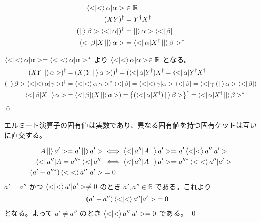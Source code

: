 \documentclass[uplatex,dvipdfmx,a4paper,11pt]{jlreq}
\makeatletter
\newcommand{\RR}{\mathbb{R}}
\numberwithin{equation}{section}
\theoremstyle{definition}
\renewenvironment{proof}[1][\proofname]{\par
  \normalfont
  \topsep6\p@\@plus6\p@ \trivlist
  \item[\hskip\labelsep{\bfseries #1}\@addpunct{\bfseries}]\ignorespaces\quad\par
}{%
  \qed\endtrivlist\@endpefalse
}
\renewcommand\proofname{証明}
\makeatother
\begin{document}
\begin{proposition}
  \begin{align}
    \braket<\alpha|\alpha>            & \in\RR                               \\
    (XY)^\dagger                      & = Y^\dagger X^\dagger                \\
    (\ket|\beta>\bra<\alpha|)^\dagger & = \ket|\alpha>\bra<\beta|            \\
    \bra<\beta|X\ket|\alpha>          & = \bra<\alpha|X^\dagger\ket|\beta>^*
  \end{align}
\end{proposition}
\begin{proof}
  $\braket<\alpha|\alpha> = \braket<\alpha|\alpha>^*$ より $\braket<\alpha|\alpha>\in\RR$ となる。
  \begin{align}
    (XY\ket|\alpha>)^\dagger                    & = (X(Y\ket|\alpha>))^\dagger = (\bra<\alpha|Y^\dagger)X^\dagger = \bra<\alpha|Y^\dagger X^\dagger                 \\
    (\ket|\beta>\braket<\alpha|\gamma>)^\dagger & = \braket<\alpha|\gamma>^*\bra<\beta| = \braket<\gamma|\alpha>\bra<\beta| = \bra<\gamma|(\ket|\alpha>\bra<\beta|) \\
    \bra<\beta|X\ket|\alpha>                    & = \bra<\beta|(X\ket|\alpha>) = \qty{(\bra<\alpha|X^\dagger)\ket|\beta>}^* = \bra<\alpha|X^\dagger\ket|\beta>^*
  \end{align}
\end{proof}

\begin{theorem}[エルミート演算子の固有ケットの直交性]
  エルミート演算子の固有値は実数であり、異なる固有値を持つ固有ケットは互いに直交する。
\end{theorem}
\begin{proof}
  \begin{align}
    A\ket|a'> = a'\ket|a'>      & \iff \bra<a''|A\ket|a'> = a'\braket<a''|a'>    \\
    \bra<a''|A = a''^*\bra<a''| & \iff \bra<a''|A\ket|a'> = a''^*\braket<a''|a'> \\
    (a' - a''^*)\braket<a''|a'> & = 0
  \end{align}
  $a' = a''$ かつ $\braket<a'|a'> \neq 0$ のとき $a', a''\in\RR$ である。これより
  \begin{align}
    (a' - a'')\braket<a''|a'> & = 0
  \end{align}
  となる。よって $a' \neq a''$ のとき $\braket<a''|a'> = 0$ である。
\end{proof}
\end{document}
